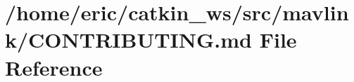 \hypertarget{mavlink_2CONTRIBUTING_8md}{}\section{/home/eric/catkin\+\_\+ws/src/mavlink/\+C\+O\+N\+T\+R\+I\+B\+U\+T\+I\+NG.md File Reference}
\label{mavlink_2CONTRIBUTING_8md}

